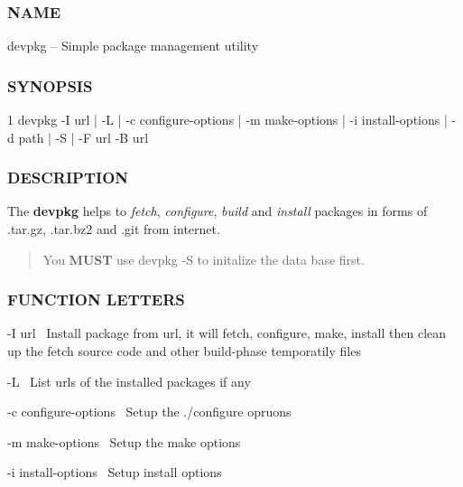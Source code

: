 \subsubsection*{N\+A\+M\+E}

devpkg -- Simple package management utility

\subsubsection*{S\+Y\+N\+O\+P\+S\+I\+S}


\begin{DoxyCode}
1 devpkg -I url | -L | -c configure-options | -m make-options | -i install-options | -d path | -S | -F url -B
       url
\end{DoxyCode}


\subsubsection*{D\+E\+S\+C\+R\+I\+P\+T\+I\+O\+N}

The {\bfseries devpkg} helps to {\itshape fetch}, {\itshape configure}, {\itshape build} and {\itshape install} packages in forms of {\ttfamily .tar.\+gz}, {\ttfamily .tar.\+bz2} and {\ttfamily .git} from internet.

\begin{quote}
You {\bfseries M\+U\+S\+T} use {\ttfamily devpkg -\/\+S} to initalize the data base first. \end{quote}


\subsubsection*{F\+U\+N\+C\+T\+I\+O\+N L\+E\+T\+T\+E\+R\+S}

{\ttfamily -\/\+I url}~\newline
 Install package from {\ttfamily url}, it will fetch, configure, make, install then clean up the fetch source code and other build-\/phase temporatily files

{\ttfamily -\/\+L}~\newline
 List urls of the installed packages if any

{\ttfamily -\/c configure-\/options}~\newline
 Setup the ./configure opruons

{\ttfamily -\/m make-\/options}~\newline
 Setup the make options

{\ttfamily -\/i install-\/options}~\newline
 Setup install options

